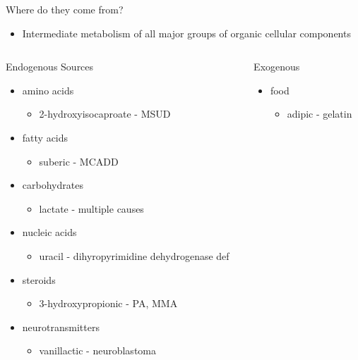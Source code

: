\documentclass[presentation, smaller]{beamer}
\begin{document}
\begin{frame}[label={sec:orgheadline6}]{Where do they come from?}
\begin{itemize}
\item Intermediate metabolism of all major groups of organic cellular
components
\end{itemize}

\begin{columns}
\begin{column}{0.5\columnwidth}
\begin{block}{Endogenous Sources}
\begin{itemize}
\item amino acids
\begin{itemize}
\item 2-hydroxyisocaproate - MSUD
\end{itemize}
\item fatty acids
\begin{itemize}
\item suberic - MCADD
\end{itemize}
\item carbohydrates
\begin{itemize}
\item lactate - multiple causes
\end{itemize}
\item nucleic acids
\begin{itemize}
\item uracil - dihyropyrimidine dehydrogenase def
\end{itemize}
\item steroids
\begin{itemize}
\item 3-hydroxypropionic - PA, MMA
\end{itemize}
\item neurotransmitters
\begin{itemize}
\item vanillactic - neuroblastoma
\end{itemize}
\end{itemize}
\end{block}
\end{column}
\begin{column}{0.45\columnwidth}
\begin{block}{Exogenous}
\begin{itemize}
\item food
\begin{itemize}
\item adipic - gelatin

\end{itemize}
\end{itemize}
\end{block}
\end{column}
\end{columns}
\end{frame}
\end{document}
